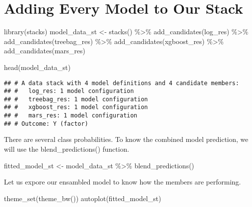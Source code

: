 \documentclass[
]{article}
\newenvironment{Shaded}{\begin{snugshade}}{\end{snugshade}}
\newcommand{\FunctionTok}[1]{\textcolor[rgb]{0.00,0.00,0.00}{#1}}
\newcommand{\NormalTok}[1]{#1}
\newcommand{\OtherTok}[1]{\textcolor[rgb]{0.56,0.35,0.01}{#1}}
\newcommand{\SpecialCharTok}[1]{\textcolor[rgb]{0.00,0.00,0.00}{#1}}
\begin{document}
\hypertarget{adding-every-model-to-our-stack}{%
\section{Adding Every Model to Our
Stack}\label{adding-every-model-to-our-stack}}

\begin{Shaded}
\begin{Highlighting}[]
\FunctionTok{library}\NormalTok{(stacks)}
\NormalTok{model\_data\_st }\OtherTok{\textless{}{-}}  \FunctionTok{stacks}\NormalTok{() }\SpecialCharTok{\%\textgreater{}\%}
  \FunctionTok{add\_candidates}\NormalTok{(log\_res) }\SpecialCharTok{\%\textgreater{}\%}
  \FunctionTok{add\_candidates}\NormalTok{(treebag\_res) }\SpecialCharTok{\%\textgreater{}\%}
  \FunctionTok{add\_candidates}\NormalTok{(xgboost\_res) }\SpecialCharTok{\%\textgreater{}\%}
  \FunctionTok{add\_candidates}\NormalTok{(mars\_res)}

\FunctionTok{head}\NormalTok{(model\_data\_st)}
\end{Highlighting}
\end{Shaded}

\begin{verbatim}
## # A data stack with 4 model definitions and 4 candidate members:
## #   log_res: 1 model configuration
## #   treebag_res: 1 model configuration
## #   xgboost_res: 1 model configuration
## #   mars_res: 1 model configuration
## # Outcome: Y (factor)
\end{verbatim}

There are several class probabilities. To know the combined model
prediction, we will use the blend\_predictions() function.

\begin{Shaded}
\begin{Highlighting}[]
\NormalTok{fitted\_model\_st }\OtherTok{\textless{}{-}}
\NormalTok{  model\_data\_st }\SpecialCharTok{\%\textgreater{}\%}
  \FunctionTok{blend\_predictions}\NormalTok{()}
\end{Highlighting}
\end{Shaded}

Let us expore our ensambled model to know how the members are
performing.

\begin{Shaded}
\begin{Highlighting}[]
\FunctionTok{theme\_set}\NormalTok{(}\FunctionTok{theme\_bw}\NormalTok{())}
\FunctionTok{autoplot}\NormalTok{(fitted\_model\_st)}
\end{Highlighting}
\end{Shaded}
\end{document}
